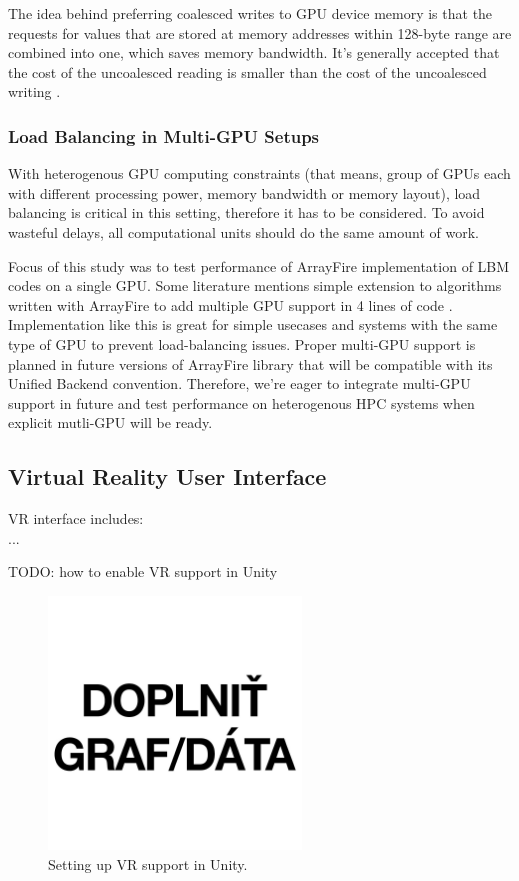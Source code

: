 The idea behind preferring coalesced writes to GPU device memory is that the requests for values that are stored at memory addresses within 128-byte range are combined into one, which saves memory bandwidth. It's generally accepted that the cost of the uncoalesced reading is smaller than the cost of the uncoalesced writing \cite{tranPerformanceOptimization3D2017}.

\subsubsection{Load Balancing in Multi-GPU Setups}
\label{sec:load-balancing}

With heterogenous GPU computing constraints (that means, group of GPUs each with different processing power, memory bandwidth or memory layout), load balancing is critical in this setting, therefore it has to be considered. To avoid wasteful delays, all computational units should do the same amount of work. 

Focus of this study was to test performance of ArrayFire implementation of LBM codes on a single GPU. Some literature mentions simple extension to algorithms written with ArrayFire to add multiple GPU support in 4 lines of code \cite{malcolmArrayFireGPUAcceleration2012a}. Implementation like this is great for simple usecases and systems with the same type of GPU to prevent load-balancing issues. Proper multi-GPU support is planned in future versions of ArrayFire library that will be compatible with its Unified Backend convention. Therefore, we're eager to integrate multi-GPU support in future and test performance on heterogenous HPC systems when explicit mutli-GPU will be ready.


\subsection{Virtual Reality User Interface}

VR interface includes: \\ 

...

TODO: how to enable VR support in Unity

\begin{figure}[!ht]
	\centering
	\includegraphics[width=0.6\textwidth]{figures/empty.jpg}
	\caption{Setting up VR support in Unity.}
	\label{fig:unity-vr-support}
\end{figure}

